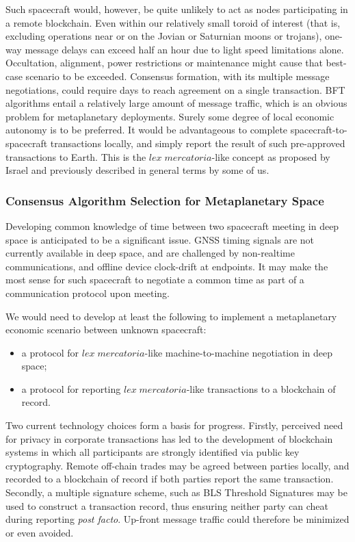 \documentclass[journal ]{new-aiaa}
\begin{document}
Such spacecraft would, however, be quite unlikely to act as nodes participating in a remote blockchain. Even within our relatively small toroid of interest (that is, excluding operations near or on the Jovian or Saturnian moons or trojans), one-way message delays can exceed half an hour due to light speed limitations alone. Occultation, alignment, power restrictions or maintenance might cause that best-case scenario to be exceeded. Consensus formation, with its multiple message negotiations, could require days to reach agreement on a single transaction. BFT algorithms entail a relatively large amount of message traffic, which is an obvious problem for metaplanetary deployments. Surely some degree of local economic autonomy is to be preferred. It would be advantageous to complete spacecraft-to-spacecraft transactions locally, and simply report the result of such pre-approved transactions to Earth. This is the $\mathit{lex\; mercatoria}$-like concept as proposed by Israel\cite{israel_space_2019} and previously described in general terms by some of us\cite{Hyland-Wood_COSPAR2019}.

\subsubsection{Consensus Algorithm Selection for Metaplanetary Space}

Developing common knowledge of time between two spacecraft meeting in deep space is anticipated to be a significant issue. GNSS timing signals are not currently available in deep space, and are challenged by non-realtime communications, and offline device clock-drift at endpoints. It may make the most sense for such spacecraft to negotiate a common time as part of a communication protocol upon meeting.

We would need to develop at least the following to implement a metaplanetary economic scenario between unknown spacecraft:

\begin{itemize}
\item a protocol for $\mathit{lex\; mercatoria}$-like machine-to-machine negotiation in deep space;
\item a protocol for reporting $\mathit{lex\; mercatoria}$-like transactions to a blockchain of record.
\end{itemize}

Two current technology choices form a basis for progress. Firstly, perceived need for privacy in corporate transactions has led to the development of blockchain systems in which all participants are strongly identified via public key cryptography. Remote off-chain trades may be agreed between parties locally, and recorded to a blockchain of record if both parties report the same transaction. Secondly, a multiple signature scheme, such as BLS Threshold Signatures\cite{boldyreva2003threshold} may be used to construct a transaction record, thus ensuring neither party can cheat during reporting \textit{post facto}. Up-front message traffic could therefore be minimized or even avoided.
\end{document}
